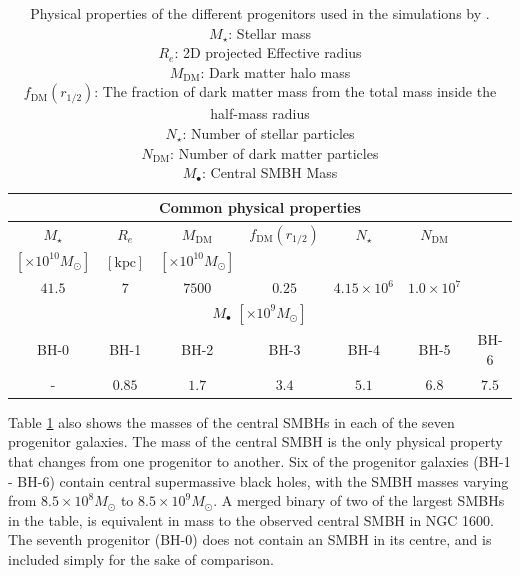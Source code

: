 \documentclass[english, oneside]{HYgradu}
\begin{document}
\begin{table}
	\begin{center}
		\begin{tabular}{| c c c c c c c |}
		\hline
		\multicolumn{7}{|c|}{Common physical properties} \\
		\hline
		$M_\star$ & $R_e$ & $M_\mathrm{DM}$ & $f_\mathrm{DM}(r_{1/2})$ & $N_\star$ & $N_\mathrm{DM}$ & \\
		$[\times 10^{10} M_\odot]$ & $\mathrm{[kpc]}$ & $[\times 10^{10} M_\odot]$ & & & & \\
		$41.5$ & $7$ & $7500$ & $0.25$ & $4.15 \times 10^6$ & $1.0 \times 10^7$ & \\
		\hline
		\hline
		\multicolumn{7}{|c|}{$M_\bullet$ $[\times10^{9} M_\odot]$} \\
		\hline
		BH-0 & BH-1 & BH-2 & BH-3 & BH-4 & BH-5 & BH-6 \\
		- & $0.85$ & $1.7$ & $3.4$ & $5.1$ & $6.8$ & $7.5$ \\
		\hline
		\end{tabular}
	\end{center}
	\caption{Physical properties of the different progenitors used in the simulations by \cite{Rantala2018}. \\
	$M_\star$: Stellar mass \\
	$R_e$: 2D projected Effective radius \\
	$M_\mathrm{DM}$: Dark matter halo mass \\
	$f_\mathrm{DM}(r_{1/2})$: The fraction of dark matter mass from the total mass inside the half-mass radius \\
	$N_\star$: Number of stellar particles \\
	$N_\mathrm{DM}$: Number of dark matter particles \\
	$M_\bullet$: Central SMBH Mass}
	\label{table:properties}
\end{table}

Table \ref{table:properties} also shows the masses of the central SMBHs in each of the seven progenitor galaxies. The mass of the central SMBH is the only physical property that changes from one progenitor to another. Six of the progenitor galaxies (BH-1 - BH-6) contain central supermassive black holes, with the SMBH masses varying from $8.5 \times 10^8 M_\odot$ to $8.5 \times 10^9 M_\odot$. A merged binary of two of the largest SMBHs in the table, is equivalent in mass to the observed central SMBH in NGC 1600. The seventh progenitor (BH-0) does not contain an SMBH in its centre, and is included simply for the sake of comparison.
\end{document}
